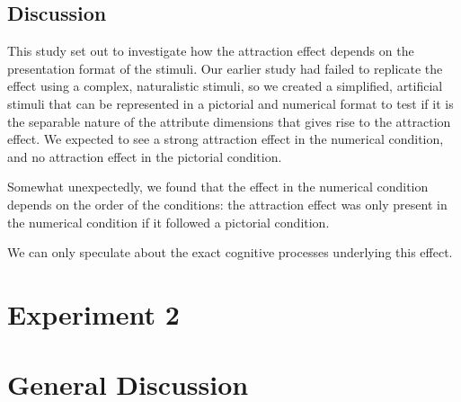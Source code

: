 \documentclass[11pt,a4paper]{article}
\begin{document}
\subsection{Discussion}

This study set out to investigate how the attraction effect depends on the presentation format of the stimuli. Our earlier study had failed to replicate the effect using a complex, naturalistic stimuli, so we created a simplified, artificial stimuli that can be represented in a pictorial and numerical format to test if it is the separable nature of the attribute dimensions that gives rise to the attraction effect.  We expected to see a strong attraction effect in the numerical condition, and no attraction effect in the pictorial condition.

Somewhat unexpectedly, we found that the effect in the numerical condition depends on the order of the conditions: the attraction effect was only present in the numerical condition if it followed a pictorial condition. 

We can only speculate about the exact cognitive processes underlying this effect.



\section{Experiment 2} 




\section{General Discussion} 










\newpage


\end{document}

